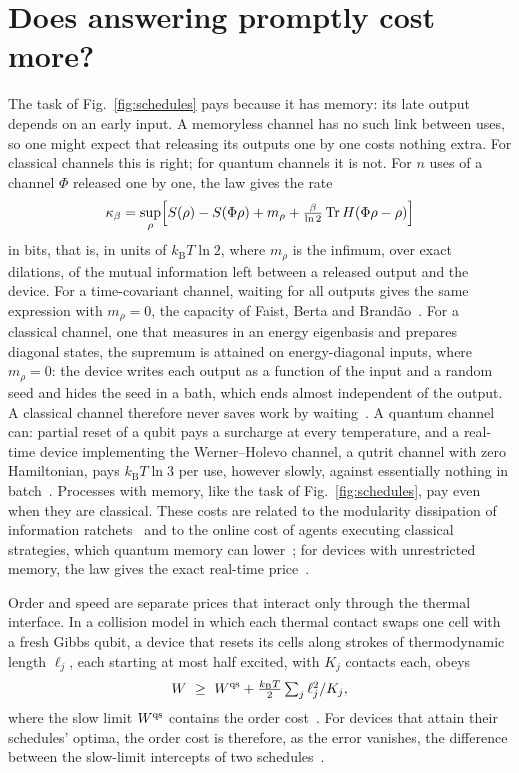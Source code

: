 \documentclass[11pt]{article}
\newcommand{\Tr}{\operatorname{Tr}}
\newcommand{\kB}{k_{\mathrm B}}
\begin{document}
\section*{Does answering promptly cost more?}
The task of Fig.~\ref{fig:schedules} pays because it has memory: its late output depends on an early input. A memoryless channel has no such link between uses, so one might expect that releasing its outputs one by one costs nothing extra. For classical channels this is right; for quantum channels it is not. For $n$ uses of a channel $\Phi$ released one by one, the law gives the rate~\cite[Thms.~1, 11]{SaveWork}
\begin{equation}\label{eq:kappa}
\kappa_\beta=\sup_\rho\Bigl[S(\rho)-S(\Phi\rho)+m_\rho+\tfrac{\beta}{\ln2}\Tr H(\Phi\rho-\rho)\Bigr]
\end{equation}
in bits, that is, in units of $\kB T\ln2$, where $m_\rho$ is the infimum, over exact dilations, of the mutual information left between a released output and the device. For a time-covariant channel, waiting for all outputs gives the same expression with $m_\rho=0$, the capacity of Faist, Berta and Brand\~ao~\cite{FBB21}. For a classical channel, one that measures in an energy eigenbasis and prepares diagonal states, the supremum is attained on energy-diagonal inputs, where $m_\rho=0$: the device writes each output as a function of the input and a random seed and hides the seed in a bath, which ends almost independent of the output. A classical channel therefore never saves work by waiting~\cite[Thm.~2]{SaveWork}. A quantum channel can: partial reset of a qubit pays a surcharge at every temperature, and a real-time device implementing the Werner--Holevo channel, a qutrit channel with zero Hamiltonian, pays $\kB T\ln3$ per use, however slowly, against essentially nothing in batch~\cite[Thms.~2--3]{SaveWork}. Processes with memory, like the task of Fig.~\ref{fig:schedules}, pay even when they are classical. These costs are related to the modularity dissipation of information ratchets~\cite{BMC18} and to the online cost of agents executing classical strategies, which quantum memory can lower~\cite{Thompson25}; for devices with unrestricted memory, the law gives the exact real-time price~\cite[Thms.~1, 9]{Answering}.

Order and speed are separate prices that interact only through the thermal interface. In a collision model in which each thermal contact swaps one cell with a fresh Gibbs qubit, a device that resets its cells along strokes of thermodynamic length $\ell_j$, each starting at most half excited, with $K_j$ contacts each, obeys
\begin{equation*}
W\ \ge\ W^{\rm qs}+\tfrac{\kB T}2\textstyle\sum_j\ell_j^2/K_j,
\end{equation*}
where the slow limit $W^{\rm qs}$ contains the order cost~\cite{Order}. For devices that attain their schedules' optima, the order cost is therefore, as the error vanishes, the difference between the slow-limit intercepts of two schedules~\cite[Sec.~8]{Order}.
\end{document}

